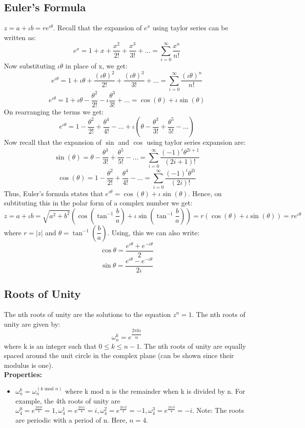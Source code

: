 \documentclass[12pt, oneside]{book}
\theoremstyle{definition}
\theoremstyle{definition}
\theoremstyle{remark}
\begin{document}
\subsection{Euler's Formula}
$z=a+\iota b=re^{\iota \theta}$. Recall that the expansion of $e^x$ using taylor series can be written as:
\[ e^x=1+x+\dfrac{x^2}{2!}+\dfrac{x^3}{3!}+\ldots = \sum_{i=0}^{\infty} \dfrac{x^n}{n!}\]
Now substituting $\iota \theta$ in place of x, we get:
\[ e^{\iota \theta}=1+\iota \theta+\dfrac{(\iota \theta)^2}{2!}+\dfrac{(\iota \theta)^3}{3!}+\ldots = \sum_{i=0}^{\infty} \dfrac{(\iota \theta)^n}{n!}\]
\[ e^{\iota \theta}=1+\iota \theta-\dfrac{\theta^2}{2!}-\iota \dfrac{\theta^3}{3!}+\ldots = \cos(\theta)+\iota \sin(\theta) \]
On rearranging the terms we get:
\[ e^{\iota \theta}= 1-\dfrac{\theta^2}{2!} + \dfrac{\theta^4}{4!} - \ldots + \iota(\theta-\dfrac{\theta^3}{3!}+\dfrac{\theta^5}{5!}-\ldots) \]
Now recall that the expansion of $\sin$ and $\cos$ using taylor series expansion are:
\[ \sin(\theta)=\theta-\dfrac{\theta^3}{3!}+\dfrac{\theta^5}{5!}-\ldots = \sum_{i=0}^{\infty} \dfrac{(-1)^i\theta^{2i+1}}{(2i+1)!} \]
\[ \cos(\theta)=1-\dfrac{\theta^2}{2!}+\dfrac{\theta^4}{4!}-\ldots = \sum_{i=0}^{\infty} \dfrac{(-1)^i\theta^{2i}}{(2i)!} \]
Thus, Euler's formula states that $e^{\iota \theta}=\cos(\theta)+\iota \sin(\theta)$.
Hence, on subtituting this in the polar form of a complex number we get:
\[ z=a+\iota b = \sqrt{a^2 + b^2} (\cos \left(\tan^{-1}\frac{b}{a}\right) + \iota \sin \left(\tan^{-1}\frac{b}{a}\right))=r(\cos(\theta)+\iota \sin(\theta))=re^{\iota \theta} \]
where $r=|z|$ and $\theta=\tan^{-1}(\dfrac{b}{a})$.
Using, this we can also write:
\[ \cos \theta = \frac{e^{\iota \theta}+e^{-\iota \theta}}{2} \] 
\[ \sin \theta = \frac{e^{\iota \theta}-e^{-\iota \theta}}{2\iota} \]

\subsection{Roots of Unity}
The nth roots of unity are the solutions to the equation $z^n=1$. The nth roots of unity are given by:
\[ \omega^k_n=e^{\dfrac{2\pi k \iota}{n}} \]
where k is an integer such that $0\leq k \leq n-1$. The nth roots of unity are equally spaced around the unit circle in the complex plane (can be shown since their modulus is one).\\
\textbf{Properties: }
\begin{itemize}
    \item $\omega^k_n=\omega_n^{(k\text{ mod }n)}$ where k mod n is the remainder when k is divided by n.
    For example, the 4th roots of unity are $\omega_4^0=e^{\frac{2\pi\iota 0}{4}}=1, \omega_4^1=e^{\frac{2\pi\iota 1}{4}}=i, \omega_4^2=e^{\frac{2\pi\iota 2}{4}}=-1, \omega_4^3=e^{\frac{2\pi\iota 3}{4}}=-i$.
    Note: The roots are periodic with a period of n. Here, $n=4$.
\end{itemize}
\end{document}
